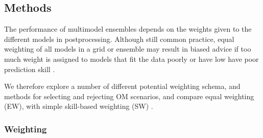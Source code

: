 \subsection*{Methods}

The performance of multimodel ensembles depends on the weights given to the different models in postprocessing. Although still common practice, equal weighting of all models in a grid or ensemble may result in biased advice if too much weight is assigned to models that fit the data poorly or have low have poor prediction skill \citep{kell2020yft}.

We therefore explore a number of different potential weighting schema, and methods for selecting and rejecting OM scenarios, and compare equal weighting (EW), with simple skill-based weighting (SW) \citep{casanova2009weighting}.

\subsubsection*{Weighting}


